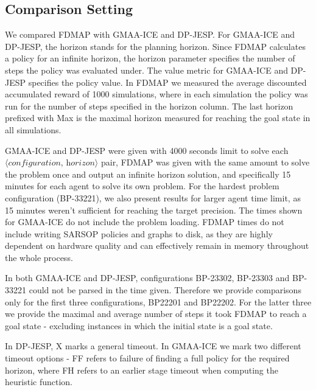 \documentclass[letterpaper]{article} %
\theoremstyle{definition}
\newcommand{\eliran}[1]{\textbf{[\color{red}ELIRAN:#1]}}
\newcommand{\ronen}[1]{\textbf{[\color{blue}RONEN:#1]}}
\begin{document}
\subsection{Comparison Setting}
We compared FDMAP with GMAA-ICE and DP-JESP. For GMAA-ICE and DP-JESP, the horizon stands for the planning horizon. Since FDMAP calculates a policy for an infinite horizon, the horizon parameter specifies the number of steps the policy was evaluated under.
The value metric for GMAA-ICE and DP-JESP specifies the policy value. In FDMAP we measured the average discounted accumulated reward of 1000 simulations, where in each simulation the policy was run for the number of steps specified in the horizon column. The last horizon prefixed with Max is the maximal horizon measured for reaching the goal state in all simulations.

GMAA-ICE and DP-JESP were given with 4000 seconds limit to solve each $\langle\textit{configuration, horizon}\rangle$ pair, FDMAP was given with the same amount to solve the problem once and output an infinite horizon solution, and specifically 15 minutes for each agent to solve its own problem. For the hardest problem configuration (BP-33221), we also present results for larger agent time limit, as 15 minutes weren't sufficient for reaching the target precision.
The times shown for GMAA-ICE do not include the problem loading. FDMAP times do not include writing SARSOP policies and graphs to disk, as they are highly dependent on hardware quality and can effectively remain in memory throughout the whole process.

In both GMAA-ICE and DP-JESP, configurations BP-23302, BP-23303 and BP-33221 could not be parsed in the time given. Therefore we provide comparisons only for the first three configurations, BP22201 and BP22202. For the latter three we provide the maximal and average number of steps it took FDMAP to reach a goal state - excluding instances in which the initial state is a goal state.

In DP-JESP, X marks a general timeout. In GMAA-ICE we mark two different timeout options - FF refers to failure of finding a full policy for the required horizon, where FH refers to an earlier stage timeout when computing the heuristic function.
\end{document}
